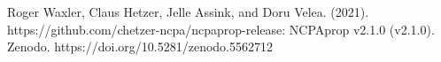 \documentclass[10pt]{article}
\begin{document}
\vspace*{\fill}

\noindent\makebox[\linewidth]{\rule{\linewidth}{0.4pt}}

\noindent Roger Waxler, Claus Hetzer, Jelle Assink, and Doru Velea. (2021). https://github.com/chetzer-ncpa/ncpaprop-release: NCPAprop v2.1.0 (v2.1.0). Zenodo. https://doi.org/10.5281/zenodo.5562712

\newpage


\vspace*{20pt}

%
\newpage
\tableofcontents
\newpage


\newpage

\newpage

\newpage

\newpage

\newpage
%

\newpage
%
%

\newpage
%
%

\newpage


\end{document}
